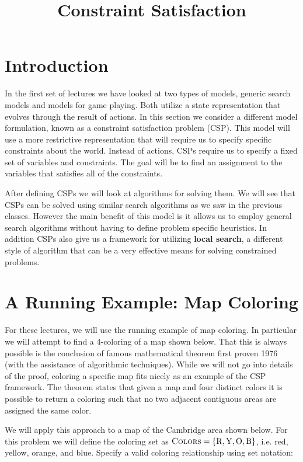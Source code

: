 \documentclass[11pt]{article}
\title{Constraint Satisfaction}
\date{}
\begin{document}
\MakeScribeTop{}

\tableofcontents
\section{Introduction}

In the first set of lectures we have looked at two types of models, generic search models
and models for game playing. Both utilize a state representation that evolves through the
result of actions. In this section we consider a different model formulation, known as a constraint
satisfaction problem (CSP). This model will use a more restrictive representation that will require
us to specify specific constraints about the world. Instead of actions, CSPs
require us to specify a  fixed set of variables and constraints. The goal will be to find an assignment to
the variables that satisfies all of the constraints.

After defining CSPs we will look at algorithms for solving them. We will
see that CSPs can be solved using similar search algorithms as we saw
in the previous classes. However the main benefit of this model is it
allows us to employ general search algorithms without having to define
problem specific heuristics. In addition CSPs also give us a framework
for utilizing \textbf{local search}, a different style of algorithm
that can be a very effective means for solving constrained
problems.

\section{A Running Example: Map Coloring}


For these lectures, we will use the running example of map
coloring. In particular we will attempt to find a 4-coloring of a map
shown below. That this is always possible is the conclusion of famous
mathematical theorem first proven 1976 (with the assistance of
algorithmic techniques). While we will not go into details of the
proof, coloring a specific map fits nicely as an example of the CSP
framework. The theorem states that given a map and four distinct colors it is
possible to return a coloring such that no two adjacent contiguous
areas are assigned the same color.

We will apply this approach to a map of the Cambridge area
shown below. For this problem we will define the coloring set as $\mathrm{\textsc{Colors}} =
\{\mathrm{R, Y, O, B}\}$, i.e. red, yellow, orange, and blue. Specify
a valid coloring relationship using set notation: 
\end{document}
